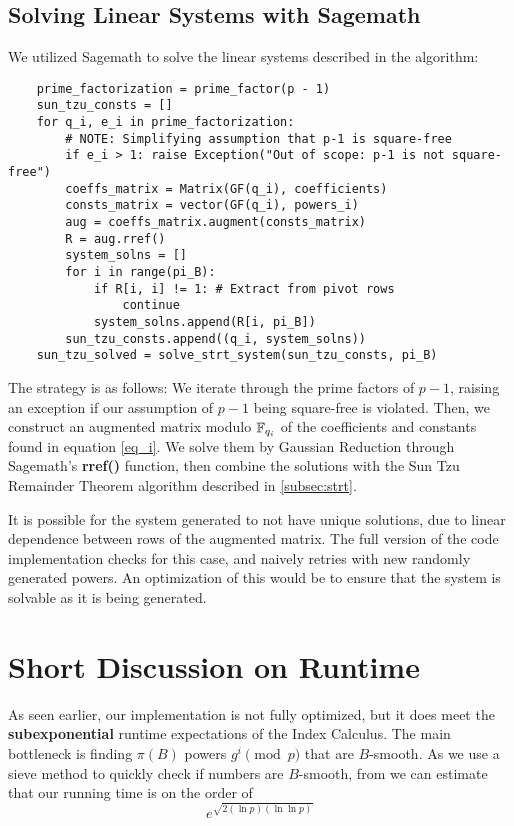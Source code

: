\documentclass[]{math_paper}
\begin{document}
\subsection{Solving Linear Systems with Sagemath} \label{subsec:linear}
We utilized Sagemath to solve the linear systems described in the algorithm:
\begin{lstlisting}
    prime_factorization = prime_factor(p - 1)
    sun_tzu_consts = []
    for q_i, e_i in prime_factorization:
        # NOTE: Simplifying assumption that p-1 is square-free
        if e_i > 1: raise Exception("Out of scope: p-1 is not square-free")
        coeffs_matrix = Matrix(GF(q_i), coefficients)
        consts_matrix = vector(GF(q_i), powers_i)
        aug = coeffs_matrix.augment(consts_matrix)
        R = aug.rref()
        system_solns = []
        for i in range(pi_B):
            if R[i, i] != 1: # Extract from pivot rows
                continue
            system_solns.append(R[i, pi_B])
        sun_tzu_consts.append((q_i, system_solns))
    sun_tzu_solved = solve_strt_system(sun_tzu_consts, pi_B)

\end{lstlisting}
The strategy is as follows: We iterate through the prime factors of $p-1$, raising an exception if our assumption of $p-1$ being square-free is violated. Then, we construct an augmented matrix modulo $\mathbb{F}_{q_i}$ of the coefficients and constants found in equation \ref{eq_i}. We solve them by Gaussian Reduction through Sagemath's \textbf{rref()} function, then combine the solutions with the Sun Tzu Remainder Theorem algorithm described in \ref{subsec:strt}.
\begin{remark} \label{rmk:lindep}
    It is possible for the system generated to not have unique solutions, due to linear dependence between rows of the augmented matrix. The full version of the code implementation checks for this case, and naively retries with new randomly generated powers. An optimization of this would be to ensure that the system is solvable as it is being generated.
\end{remark}


\section{Short Discussion on Runtime} \label{sec:runtime}
As seen earlier, our implementation is not fully optimized, but it does meet the \textbf{subexponential} runtime expectations of the Index Calculus. The main bottleneck is finding $\pi(B)$ powers $g^i \pmod p$ that are $B$-smooth. As we use a sieve method to quickly check if numbers are $B$-smooth, from \cite{Hoffstein2008} we can estimate that our running time is on the order of
\[
    e^{\sqrt{2(\ln p)(\ln \ln p)}}
\]
\end{document}
